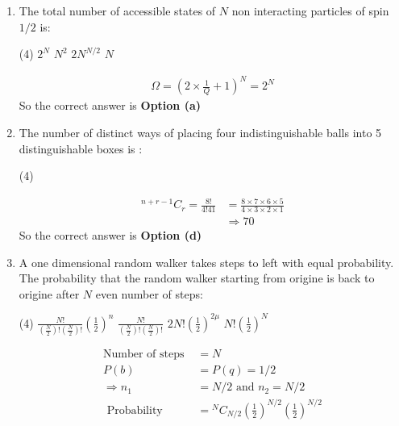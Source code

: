 \begin{enumerate}
	\item The total number of accessible states of $N$ non interacting particles of spin $1/2$ is:
	\begin{tasks}(4)
		\task[\textbf{a.}]$2^{N}$
		\task[\textbf{b.}]$N^{2}$
		\task[\textbf{c.}]$2 N^{N / 2}$
		\task[\textbf{d.}]  $N$
	\end{tasks}
	\begin{answer}
		\begin{align*}
		\Omega=\left(2 \times \frac{1}{Q}+1\right)^{N}=2^{N}
		\end{align*}
		So the correct answer is \textbf{Option (a)}
	\end{answer}
	\item The number of distinct ways of placing four indistinguishable balls into 5 distinguishable boxes is :
	\begin{tasks}(4)
	\end{tasks}
	\begin{answer}
		\begin{align*}
		{ }^{n+r-1} C_{r}=\frac{8 !}{4 ! 41}&=\frac{8 \times 7 \times 6 \times 5}{4 \times 3 \times 2 \times 1}\\
		&\Rightarrow70
		\end{align*}
		So the correct answer is \textbf{Option (d)}
	\end{answer}
	\item A one dimensional random walker takes steps to left with equal probability.  The probability that the random walker starting from origine is back to origine after $N$ even number of steps:
	\begin{tasks}(4)
		\task[\textbf{a.}]$\frac{N !}{\left(\frac{N}{2}\right) !\left(\frac{N}{2}\right) !}\left(\frac{1}{2}\right)^{n}$
		\task[\textbf{b.}]$\frac{N !}{\left(\frac{N}{2}\right) !\left(\frac{N}{2}\right) !}$
		\task[\textbf{c.}] $2N!\left(\frac{1}{2}\right)^{2 \mu}$
		\task[\textbf{d.}] $N !\left(\frac{1}{2}\right)^{N}$
	\end{tasks}
	\begin{answer}
		\begin{align*}
		\text{Number of steps }&=N\\
		P(b)&=P(q)=1/2 \\
		\Rightarrow n_{1}&=N / 2 \text { and } n_{2}=N / 2\\
		\text { Probability  }&={ }^{N} C_{N / 2}\left(\frac{1}{2}\right)^{N / 2}\left(\frac{1}{2}\right)^{N / 2}\\

\end{align*}
\end{answer}
\end{enumerate}
